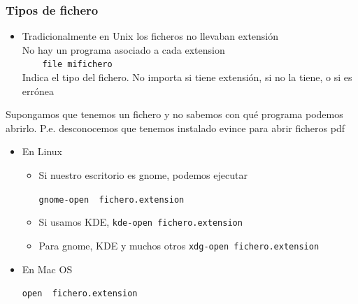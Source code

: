 \documentclass[ucs]{beamer}
\begin{document}

\begin{frame}[fragile]
\frametitle{Tipos de fichero}
\begin{itemize} 
\item Tradicionalmente en Unix los ficheros no llevaban extensión\\
No hay un programa asociado a cada extension\\
\verb|    file mifichero          |   \\  
Indica el tipo del fichero. No importa si 
tiene extensión, si no la tiene, o si es errónea
%
%

%
%
\end{itemize}

Supongamos que tenemos un fichero y no sabemos
con qué programa podemos
abrirlo. P.e. desconocemos que tenemos
instalado evince para abrir ficheros pdf


\begin{itemize}
\item
En Linux

\begin{itemize}
\item
Si nuestro escritorio es gnome, podemos ejecutar

\verb|gnome-open  fichero.extension| 

\item
	Si usamos KDE, 
\verb|kde-open fichero.extension| 
\item
	Para gnome, KDE y muchos otros
\verb|xdg-open fichero.extension| 
		 
\end{itemize}

\item
	En Mac OS

\verb|open  fichero.extension| 

\end{itemize}


\end{frame}
\end{document}

